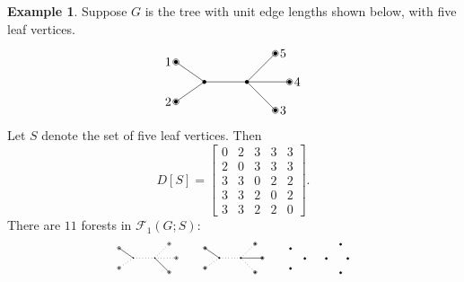 \documentclass{amsart}
\theoremstyle{definition}
\newtheorem{eg}[thm]{Example}
\newcommand{\trees}{\mathcal{F}_1}
\begin{document}
\begin{eg}
Suppose $G$ is the tree with unit edge lengths shown below, with five leaf vertices.
\[
\begin{tikzpicture}[scale=0.8]
	\coordinate (1) at (-2,0.7);
	\coordinate (2) at (-2,-0.7);
	\coordinate (3) at (1.5,-1);
	\coordinate (4) at (2,0);
	\coordinate (5) at (1.5,1);
	\coordinate (A) at (-1,0);
	\coordinate (B) at (0.5,0);
	
	\foreach \c in {1,2,3,4,5,A,B} {
		\fill (\c) circle (2pt);
	}
	\foreach \c in {1,2,3,4,5} {
		\draw (\c) circle (3pt);
	}

	\draw (A) -- (1);
	\draw (A) -- (2);
	\draw (B) -- (3);
	\draw (B) -- (4);
	\draw (B) -- (5);
	\draw (A) -- (B);
	
	\foreach \c/\d in {1/left,2/left,3/right,4/right,5/right} {
		\node[\d=0.2] at (\c) {$\c$};
	}
\end{tikzpicture}
\]
Let $S$ denote the set of five leaf vertices. Then
$$
D[S] = \begin{bmatrix}
0 & 2 & 3 & 3 & 3 \\
2 & 0 & 3 & 3 & 3 \\
3 & 3 & 0 & 2 & 2 \\
3 & 3 & 2 & 0 & 2 \\
3 & 3 & 2 & 2 & 0
\end{bmatrix}.
$$
There are $11$ forests in $\trees(G;S)$:
\[
\begin{tikzpicture}[scale=0.4]
	\coordinate (1) at (-2,0.7);
	\coordinate (2) at (-2,-0.7);
	\coordinate (3) at (1.5,-1);
	\coordinate (4) at (2,0);
	\coordinate (5) at (1.5,1);
	\coordinate (A) at (-1,0);
	\coordinate (B) at (0.5,0);
	
	\foreach \c in {1,2,3,4,5,A,B} {
		\fill (\c) circle (1.5pt);
	}
	\foreach \c in {1,2,3,4,5} {
		\draw (\c) circle (3pt);
	}

	\draw (A) -- (1);
	\draw[dotted] (A) -- (2);
	\draw (B) -- (3);
	\draw[dotted] (B) -- (4);
	\draw[dotted] (B) -- (5);
	\draw[dotted] (A) -- (B);
\end{tikzpicture}
\qquad
\begin{tikzpicture}[scale=0.4]
	\coordinate (1) at (-2,0.7);
	\coordinate (2) at (-2,-0.7);
	\coordinate (3) at (1.5,-1);
	\coordinate (4) at (2,0);
	\coordinate (5) at (1.5,1);
	\coordinate (A) at (-1,0);
	\coordinate (B) at (0.5,0);
	
	\foreach \c in {1,2,3,4,5,A,B} {
		\fill (\c) circle (1.8pt);
	}
	\foreach \c in {1,2,3,4,5} {
		\draw (\c) circle (3pt);
	}

	\draw (A) -- (1);
	\draw[dotted] (A) -- (2);
	\draw[dotted] (B) -- (3);
	\draw (B) -- (4);
	\draw[dotted] (B) -- (5);
	\draw[dotted] (A) -- (B);
\end{tikzpicture}
\qquad
\begin{tikzpicture}[scale=0.4]
	\filldraw[black] (-2,0.7) coordinate (1) circle (2pt);
	\filldraw[black] (-2,-0.7) coordinate (2) circle (2pt);
	\filldraw[black] (1.5,-1) coordinate (3) circle (2pt);
	\filldraw[black] (2,0) coordinate (4) circle (2pt);
	\filldraw[black] (1.5,1) coordinate (5) circle (2pt);
	\filldraw[black] (-1,0) coordinate (A) circle (2pt);
	\filldraw[black] (0.5,0) coordinate (B) circle (2pt);


\end{tikzpicture}\]
\end{eg}
\end{document}
